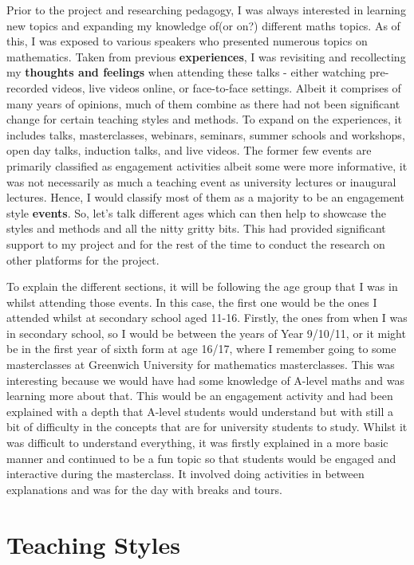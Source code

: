 \documentclass[12pt, a4paper,oneside]{book}
\numberwithin{equation}{section}
\begin{document}
Prior to the project and researching pedagogy, I was always interested in learning new topics and expanding my knowledge of(or on?) different maths topics. As of this, I was exposed to various speakers who presented numerous topics on mathematics. Taken from previous {\color{red}\textbf{experiences}}, I was revisiting and recollecting my {\color{red}\textbf{thoughts and feelings}} when attending these talks - either watching pre-recorded videos, live videos online, or face-to-face settings. Albeit it comprises of many years of opinions, much of them combine as there had not been significant change for certain teaching styles and methods. To expand on the experiences, it includes talks, masterclasses, webinars, seminars, summer schools and workshops, open day talks, induction talks, and live videos. The former few events are primarily classified as engagement activities albeit some were more informative, it was not necessarily as much a teaching event as university lectures or inaugural lectures. Hence, I would classify most of them as a majority to be an engagement style {\color{red}\textbf{events}}. So, let's talk different ages which can then help to showcase the styles and methods and all the nitty gritty bits. This had provided significant support to my project and for the rest of the time to conduct the research on other platforms for the project. 

To explain the different sections, it will be following the age group that I was in whilst attending those events. In this case, the first one would be the ones I attended whilst at secondary school aged 11-16. Firstly, the ones from when I was in secondary school, so I would be between the years of Year 9/10/11, or it might be in the first year of sixth form at age 16/17, where I remember going to some masterclasses at Greenwich University for mathematics masterclasses. This was interesting because we would have had some knowledge of A-level maths and was learning more about that. This would be an engagement activity and had been explained with a depth that A-level students would understand but with still a bit of difficulty in the concepts that are for university students to study. Whilst it was difficult to understand everything, it was firstly explained in a more basic manner and continued to be a fun topic so that students would be engaged and interactive during the masterclass. It involved doing activities in between explanations and was for the day with breaks and tours.

\section{Teaching Styles}\label{sec:2.1}
\end{document}
